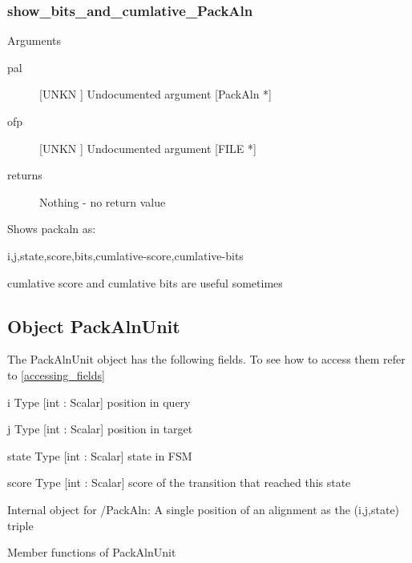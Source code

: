 \subsubsection{show_bits_and_cumlative_PackAln}

Arguments
\begin{description}
\item[pal] [UNKN ] Undocumented argument [PackAln *]
\item[ofp] [UNKN ] Undocumented argument [FILE *]
\item[returns] Nothing - no return value
\end{description}
Shows packaln as: 


i,j,state,score,bits,cumlative-score,cumlative-bits


cumlative score and cumlative bits are useful sometimes


\subsection{Object PackAlnUnit}

\label{object_PackAlnUnit}

The PackAlnUnit object has the following fields. To see how to access them refer to \ref{accessing_fields}
\begin{description}
\item{i} Type [int : Scalar]  position in query 

\item{j} Type [int : Scalar]  position in target

\item{state} Type [int : Scalar]  state in FSM

\item{score} Type [int : Scalar]  score of the transition that reached this state

\end{description}
Internal object for /PackAln:
A single position of an alignment
as the (i,j,state) triple




Member functions of PackAlnUnit

